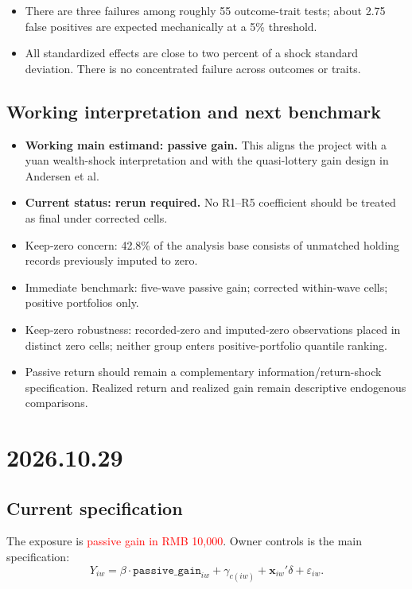 \documentclass[11pt,letterpaper,english,final]{article}
\begin{document}
\begin{itemize}
\item There are three failures among roughly 55 outcome-trait tests; about 2.75 false positives are expected mechanically at a 5\% threshold.
\item All standardized effects are close to two percent of a shock standard deviation. There is no concentrated failure across outcomes or traits.
\end{itemize}

\subsection{Working interpretation and next benchmark}

\begin{itemize}
\item \textbf{Working main estimand: passive gain.} This aligns the project with a yuan wealth-shock interpretation and with the quasi-lottery gain design in Andersen et al.
\item \textbf{Current status: rerun required.} No R1--R5 coefficient should be treated as final under corrected cells.
\item Keep-zero concern: 42.8\% of the analysis base consists of unmatched holding records previously imputed to zero.
\item Immediate benchmark: five-wave passive gain; corrected within-wave cells; positive portfolios only.
\item Keep-zero robustness: recorded-zero and imputed-zero observations placed in distinct zero cells; neither group enters positive-portfolio quantile ranking.
\item Passive return should remain a complementary information/return-shock specification. Realized return and realized gain remain descriptive endogenous comparisons.
\end{itemize}

\clearpage
\section{2026.10.29}
\setcounter{table}{0}

\subsection{Current specification}
The exposure is \textcolor{red}{passive gain in RMB 10,000}. Owner controls is the main specification:
\[
Y_{iw}=\beta\cdot\texttt{passive\_gain}_{iw}
+\gamma_{c(iw)}+\bm{x}_{iw}'\delta+\varepsilon_{iw}.
\]
\end{document}
